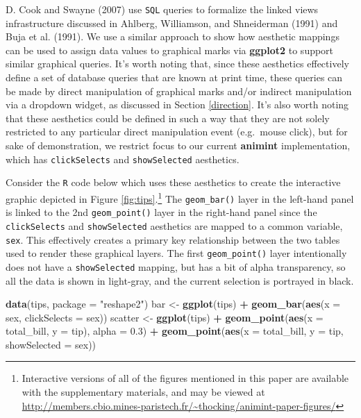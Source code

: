 \documentclass[12pt,]{article}
\newenvironment{Shaded}{\begin{snugshade}}{\end{snugshade}}
\newcommand{\DataTypeTok}[1]{\textcolor[rgb]{0.13,0.29,0.53}{#1}}
\newcommand{\FloatTok}[1]{\textcolor[rgb]{0.00,0.00,0.81}{#1}}
\newcommand{\KeywordTok}[1]{\textcolor[rgb]{0.13,0.29,0.53}{\textbf{#1}}}
\newcommand{\NormalTok}[1]{#1}
\newcommand{\OperatorTok}[1]{\textcolor[rgb]{0.81,0.36,0.00}{\textbf{#1}}}
\newcommand{\StringTok}[1]{\textcolor[rgb]{0.31,0.60,0.02}{#1}}
\let\rmarkdownfootnote\footnote%
\def\footnote{\protect\rmarkdownfootnote}
\theoremstyle{definition}
\theoremstyle{definition}
\theoremstyle{definition}
\theoremstyle{remark}
\begin{document}
D. Cook and Swayne (2007) use \texttt{SQL} queries to formalize the
linked views infrastructure discussed in Ahlberg, Williamson, and
Shneiderman (1991) and Buja et al. (1991). We use a similar approach to
show how aesthetic mappings can be used to assign data values to
graphical marks via \textbf{ggplot2} to support similar graphical
queries. It's worth noting that, since these aesthetics effectively
define a set of database queries that are known at print time, these
queries can be made by direct manipulation of graphical marks and/or
indirect manipulation via a dropdown widget, as discussed in Section
\ref{direction}. It's also worth noting that these aesthetics could be
defined in such a way that they are not solely restricted to any
particular direct manipulation event (e.g.~mouse click), but for sake of
demonstration, we restrict focus to our current \textbf{animint}
implementation, which has \texttt{clickSelects} and
\texttt{showSelected} aesthetics.

Consider the \texttt{R} code below which uses these aesthetics to create
the interactive graphic depicted in Figure
\ref{fig:tips}.\footnote{Interactive versions
of all of the figures mentioned in this paper are available with the supplementary
materials, and may be viewed at 
\url{http://members.cbio.mines-paristech.fr/~thocking/animint-paper-figures/}}
The \texttt{geom\_bar()} layer in the left-hand panel is linked to the
2nd \texttt{geom\_point()} layer in the right-hand panel since the
\texttt{clickSelects} and \texttt{showSelected} aesthetics are mapped to
a common variable, \texttt{sex}. This effectively creates a primary key
relationship between the two tables used to render these graphical
layers. The first \texttt{geom\_point()} layer intentionally does not
have a \texttt{showSelected} mapping, but has a bit of alpha
transparency, so all the data is shown in light-gray, and the current
selection is portrayed in black.

\begin{Shaded}
\begin{Highlighting}[]
\KeywordTok{data}\NormalTok{(tips, }\DataTypeTok{package =} \StringTok{"reshape2"}\NormalTok{)}
\NormalTok{bar <-}\StringTok{ }\KeywordTok{ggplot}\NormalTok{(tips) }\OperatorTok{+}\StringTok{ }
\StringTok{  }\KeywordTok{geom_bar}\NormalTok{(}\KeywordTok{aes}\NormalTok{(}\DataTypeTok{x =}\NormalTok{ sex, }\DataTypeTok{clickSelects =}\NormalTok{ sex))}
\NormalTok{scatter <-}\StringTok{ }\KeywordTok{ggplot}\NormalTok{(tips) }\OperatorTok{+}
\StringTok{  }\KeywordTok{geom_point}\NormalTok{(}\KeywordTok{aes}\NormalTok{(}\DataTypeTok{x =}\NormalTok{ total_bill, }\DataTypeTok{y =}\NormalTok{ tip), }\DataTypeTok{alpha =} \FloatTok{0.3}\NormalTok{) }\OperatorTok{+}
\StringTok{  }\KeywordTok{geom_point}\NormalTok{(}\KeywordTok{aes}\NormalTok{(}\DataTypeTok{x =}\NormalTok{ total_bill, }\DataTypeTok{y =}\NormalTok{ tip, }\DataTypeTok{showSelected =}\NormalTok{ sex))}
\end{Highlighting}
\end{Shaded}
\end{document}
